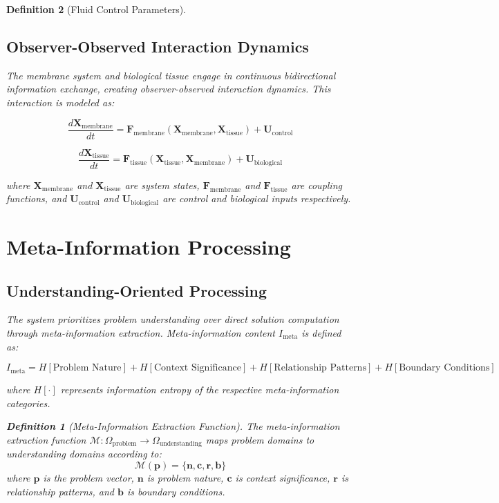 \documentclass[12pt,a4paper]{article}
\newtheorem{definition}{Definition}
\begin{document}
\begin{definition}[Fluid Control Parameters]
\subsection{Observer-Observed Interaction Dynamics}

The membrane system and biological tissue engage in continuous bidirectional information exchange, creating observer-observed interaction dynamics. This interaction is modeled as:

\begin{equation}
\frac{d\mathbf{X}_{\text{membrane}}}{dt} = \mathbf{F}_{\text{membrane}}(\mathbf{X}_{\text{membrane}}, \mathbf{X}_{\text{tissue}}) + \mathbf{U}_{\text{control}}
\end{equation}

\begin{equation}
\frac{d\mathbf{X}_{\text{tissue}}}{dt} = \mathbf{F}_{\text{tissue}}(\mathbf{X}_{\text{tissue}}, \mathbf{X}_{\text{membrane}}) + \mathbf{U}_{\text{biological}}
\end{equation}

where $\mathbf{X}_{\text{membrane}}$ and $\mathbf{X}_{\text{tissue}}$ are system states, $\mathbf{F}_{\text{membrane}}$ and $\mathbf{F}_{\text{tissue}}$ are coupling functions, and $\mathbf{U}_{\text{control}}$ and $\mathbf{U}_{\text{biological}}$ are control and biological inputs respectively.

\section{Meta-Information Processing}

\subsection{Understanding-Oriented Processing}

The system prioritizes problem understanding over direct solution computation through meta-information extraction. Meta-information content $I_{\text{meta}}$ is defined as:

\begin{equation}
I_{\text{meta}} = H[\text{Problem Nature}] + H[\text{Context Significance}] + H[\text{Relationship Patterns}] + H[\text{Boundary Conditions}]
\end{equation}

where $H[\cdot]$ represents information entropy of the respective meta-information categories.

\begin{definition}[Meta-Information Extraction Function]
The meta-information extraction function $\mathcal{M}: \Omega_{\text{problem}} \to \Omega_{\text{understanding}}$ maps problem domains to understanding domains according to:
\begin{equation}
\mathcal{M}(\mathbf{p}) = \{\mathbf{n}, \mathbf{c}, \mathbf{r}, \mathbf{b}\}
\end{equation}
where $\mathbf{p}$ is the problem vector, $\mathbf{n}$ is problem nature, $\mathbf{c}$ is context significance, $\mathbf{r}$ is relationship patterns, and $\mathbf{b}$ is boundary conditions.
\end{definition}


\end{definition}
\end{document}
